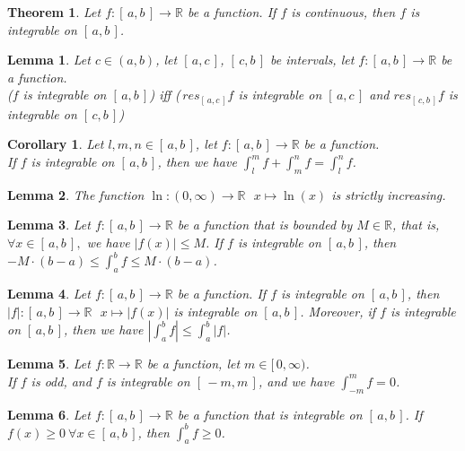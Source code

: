 \documentclass[11pt]{article}
\theoremstyle{break}
\theoremstyle{break}
\newtheorem{thm}{Theorem}[section]
\newtheorem{lem}{Lemma}[thm]
\newtheorem{corL}{Corollary}[lem]
\newcommand{\R}{\mathbb{R}}
\newcommand{\Intab}{[\,a,b\,]}
\begin{document}
	\begin{thm}
		Let $f:\Intab \to \R$ be a function. If $f$ is continuous, then $f$ is integrable on $\Intab$.
	\end{thm}
	
	\begin{lem}
		Let $c \in (a,b)$, let $[\,a,c\,]$, $[\,c,b\,]$ be intervals, let $f:[\,a,b\,] \to \R$ be a function.\\ ($f$ is integrable on $\Intab$) iff (\,$res_{[\,a,c\,]}f$ is integrable on $[\,a,c\,]$ and $res_{[\,c,b\,]}f$ is integrable on $[\,c,b\,]$)
	\end{lem}
	
	\begin{corL}
		Let $l,m,n \in \Intab$, let $f:[\,a,b\,] \to \R$ be a function.\\ If $f$ is integrable on $\Intab$, then we have $\int_l^m f + \int_m^n f = \int_l^n f$.
	\end{corL}
	
	\begin{lem}
		The function $\ln:(0,\infty) \to \R \ \ \ x \mapsto \ln(x)$ is strictly increasing.
	\end{lem}
	
	\begin{lem}
		Let $f:\Intab \to \R$ be a function that is bounded by $M \in \R$, that is, $ \forall x \in \Intab,$ we have $ |f(x)| \leq M$. If $f$ is integrable on $\Intab$, then $-M \cdot (b-a) \leq \int_a^b f \leq M \cdot (b-a)$.
	\end{lem}
	
	\begin{lem}
		Let $f:\Intab \to \R$ be a function. If $f$ is integrable on $\Intab$, then $|f|:\Intab \to \R \ \ \ x \mapsto |f(x)|$ is integrable on $\Intab$. Moreover, if $f$ is integrable on $\Intab$, then we have $| \int_a^b f | \leq \int_a^b |f|$.
	\end{lem}
	
	\begin{lem}
		Let $f:\R \to \R$ be a function, let $m \in [\,0,\infty)$. \\If $f$ is odd, and $f$ is integrable on $[\,-m,m\,]$, and we have $\int_{-m}^m f =0$.
	\end{lem}
	
	\begin{lem}
		Let $f:\Intab \to \R$ be a function that is integrable on $\Intab$. If $f(x) \geq 0 \  \forall x \in \Intab$, then $\int_a^b f \geq 0$.
	\end{lem}
	
\end{document}
